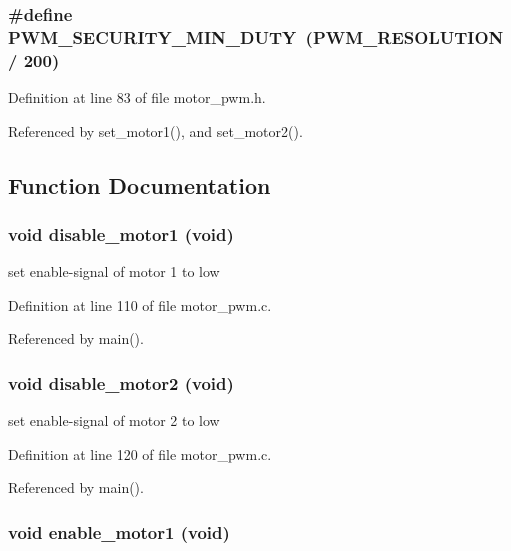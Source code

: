 \subsubsection{\setlength{\rightskip}{0pt plus 5cm}\#define PWM\_\-SECURITY\_\-MIN\_\-DUTY~(PWM\_\-RESOLUTION / 200)}\label{group__ro__motor__pwm_ge8ab18fa7dc74ecfc6f06887f3d8ae20}




Definition at line 83 of file motor\_\-pwm.h.

Referenced by set\_\-motor1(), and set\_\-motor2().

\subsection{Function Documentation}
\subsubsection{\setlength{\rightskip}{0pt plus 5cm}void disable\_\-motor1 (void)\hspace{0.3cm}{\tt  [inline]}}\label{group__ro__motor__pwm_gb19a14ee7f5870471591172ab341e5b8}


set enable-signal of motor 1 to low 

Definition at line 110 of file motor\_\-pwm.c.

Referenced by main().
\subsubsection{\setlength{\rightskip}{0pt plus 5cm}void disable\_\-motor2 (void)\hspace{0.3cm}{\tt  [inline]}}\label{group__ro__motor__pwm_gd10579e788ea58460992ffafe3227c02}


set enable-signal of motor 2 to low 

Definition at line 120 of file motor\_\-pwm.c.

Referenced by main().
\subsubsection{\setlength{\rightskip}{0pt plus 5cm}void enable\_\-motor1 (void)\hspace{0.3cm}{\tt  [inline]}}\label{group__ro__motor__pwm_gd36c8e4b0f548489729dd29c5dec7133}


